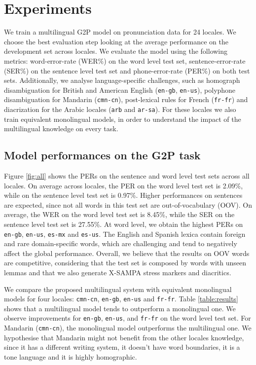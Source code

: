 \section{Experiments}
\label{sec:exp}

We train a multilingual G2P model on pronunciation data for 24 locales. We choose the best evaluation step looking at the average performance on the development set across locales. We evaluate the model using the following metrics: word-error-rate (WER\%) on the word level test set, sentence-error-rate (SER\%) on the sentence level test set and phone-error-rate (PER\%) on both test sets. Additionally, we analyse language-specific challenges, such as homograph disambiguation for British and American English (\texttt{en-gb}, \texttt{en-us}), polyphone disambiguation for Mandarin (\texttt{cmn-cn}), post-lexical rules for French (\texttt{fr-fr}) and diacrization for the Arabic locales (\texttt{arb} and \texttt{ar-sa}). For these locales we also train equivalent monolingual models, in order to understand the impact of the multilingual knowledge on every task.


\subsection{Model performances on the G2P task}
\label{subsec:results}
Figure \ref{fig:all} shows the PERs on the sentence and word level test sets across all locales. On average across locales, the PER on the word level test set is 2.09\%, while on the sentence level test set is 0.97\%. Higher performances on sentences are expected, since not all words in this test set are out-of-vocabulary (OOV).
On average, the WER on the word level test set is 8.45\%, while the SER on the sentence level test set is 27.55\%.
At word level, we obtain the highest PERs on \texttt{en-gb}, \texttt{en-us}, \texttt{es-mx} and \texttt{es-us}. The English and Spanish lexica contain foreign and rare domain-specific words, which are challenging and tend to negatively affect the global performance. Overall, we believe that the results on OOV words are competitive, considering that the test set is composed by words with unseen lemmas and that we also generate X-SAMPA stress markers and diacritics.

We compare the proposed multilingual system with equivalent monolingual models for four locales: \texttt{cmn-cn}, \texttt{en-gb}, \texttt{en-us} and \texttt{fr-fr}.
Table \ref{table:results} shows that a multilingual model tends to outperform a monolingual one.
We observe improvements for \texttt{en-gb}, \texttt{en-us}, and \texttt{fr-fr} on the word level test set.
For Mandarin (\texttt{cmn-cn}), the monolingual model outperforms the multilingual one. We hypothesise that Mandarin might not benefit from the other locales knowledge, since it has a different writing system, it doesn't have word boundaries, it is a tone language and it is highly homographic.

